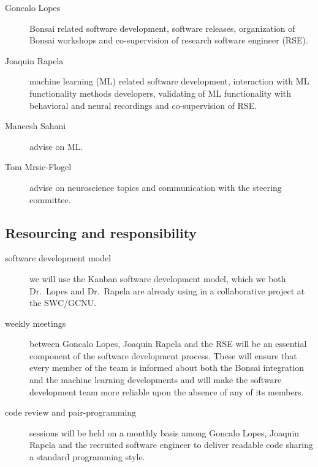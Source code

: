 \documentclass[a4paper,11pt]{article}
\begin{document}
\begin{description}

    \item[Goncalo Lopes] Bonsai related software development,
        software releases, organization of Bonsai workshops
        and co-supervision of research software engineer (RSE).

    \item[Joaquin Rapela] machine learning (ML) related software development,
        interaction with ML functionality methods developers, validating of ML
        functionality with behavioral and neural recordings and co-supervision
        of RSE.

    \item[Maneesh Sahani] advise on ML.

    \item[Tom Mrsic-Flogel] advise on neuroscience topics and communication
        with the steering committee.

\end{description}

\subsection*{Resourcing and responsibility}

\begin{description}

    \item[software development model] we will use the Kanban software
        development model, which we both Dr.~Lopes and Dr.~Rapela are already
        using in a collaborative project at the SWC/GCNU.

    \item[weekly meetings] between Goncalo Lopes, Joaquin Rapela and the RSE
        will be an essential component of the software development process.
        These will ensure that every member of the team is informed about both
        the Bonsai integration and the machine learning developments and will
        make the software development team more reliable upon the absence of
        any of its members.

    \item[code review and pair-programming] sessions will be held on a monthly basis among Goncalo Lopes, Joaquin Rapela and the recruited software engineer to deliver readable code sharing a standard programming style.

\end{description}
\end{document}
